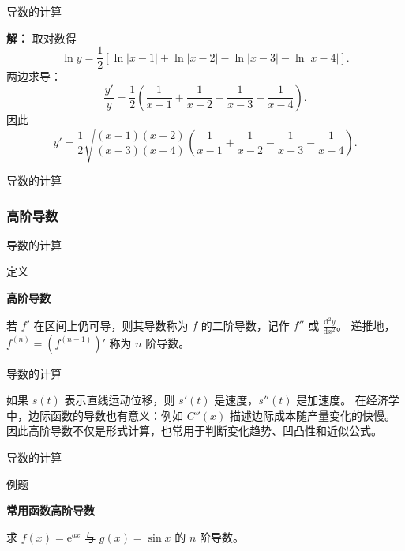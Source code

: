 \documentclass[aspectratio=169,10pt,fontset=fandol]{ctexbeamer}
\newcommand{\dd}{\mathrm{d}}
\newcommand{\ee}{\mathrm{e}}
\begin{document}
\begin{frame}[t,fragile]{导数的计算}
\footnotesize
{\footnotesize
\textbf{解：}
取对数得
	\[
	\ln y=\frac12\left[\ln|x-1|+\ln|x-2|-\ln|x-3|-\ln|x-4|\right].
	\]
	两边求导：
	\[
	\frac{y'}{y}
	=\frac12\left(\frac1{x-1}+\frac1{x-2}-\frac1{x-3}-\frac1{x-4}\right).
	\]
	因此
	\[
	y'=\frac12\sqrt{\frac{(x-1)(x-2)}{(x-3)(x-4)}}
	\left(\frac1{x-1}+\frac1{x-2}-\frac1{x-3}-\frac1{x-4}\right).
	\]

}
\end{frame}
\begin{frame}[t,fragile]{导数的计算}
\footnotesize
{\footnotesize

\subsubsection*{高阶导数}


}
\end{frame}
\begin{frame}[t,fragile]{导数的计算}
\footnotesize
\begin{block}{定义}
{\footnotesize
\textbf{高阶导数}\par

若 $f'$ 在区间上仍可导，则其导数称为 $f$ 的二阶导数，记作 $f''$ 或 $\frac{\dd^2y}{\dd x^2}$。 递推地，$f^{(n)}=(f^{(n-1)})'$ 称为 $n$ 阶导数。

}
\end{block}
\end{frame}
\begin{frame}[t,fragile]{导数的计算}
\footnotesize
{\footnotesize
如果 $s(t)$ 表示直线运动位移，则 $s'(t)$ 是速度，$s''(t)$ 是加速度。 在经济学中，边际函数的导数也有意义：例如 $C''(x)$ 描述边际成本随产量变化的快慢。 因此高阶导数不仅是形式计算，也常用于判断变化趋势、凹凸性和近似公式。


}
\end{frame}
\begin{frame}[t,fragile]{导数的计算}
\footnotesize
\begin{block}{例题}
{\footnotesize
\textbf{常用函数高阶导数}\par

求 $f(x)=\ee^{ax}$ 与 $g(x)=\sin x$ 的 $n$ 阶导数。

}
\end{block}
\end{frame}
\end{document}

